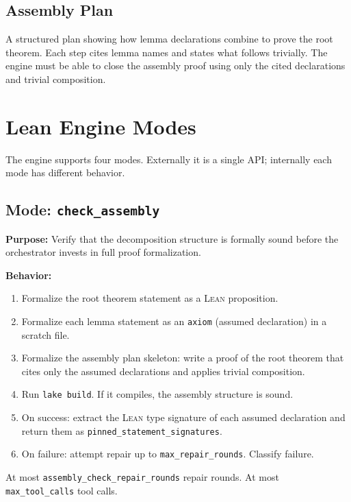 \documentclass[11pt,a4paper]{article}
\newcommand{\Lean}{\textsc{Lean}}
\begin{document}
\subsection{Assembly Plan}
A structured plan showing how lemma declarations combine to prove the root theorem. Each step cites lemma names and states what follows trivially. The engine must be able to close the assembly proof using only the cited declarations and trivial composition.

\section{Lean Engine Modes}
\label{sec:modes}

The engine supports four modes. Externally it is a single API; internally each mode has different behavior.

\subsection{Mode: \texttt{check\_assembly}}

\textbf{Purpose:} Verify that the decomposition structure is formally sound before the orchestrator invests in full proof formalization.

\textbf{Behavior:}
\begin{enumerate}[leftmargin=2em]
  \item Formalize the root theorem statement as a \Lean{} proposition.
  \item Formalize each lemma statement as an \texttt{axiom} (assumed declaration) in a scratch file.
  \item Formalize the assembly plan skeleton: write a proof of the root theorem that cites only the assumed declarations and applies trivial composition.
  \item Run \texttt{lake build}. If it compiles, the assembly structure is sound.
  \item On success: extract the \Lean{} type signature of each assumed declaration and return them as \texttt{pinned\_statement\_signatures}.
  \item On failure: attempt repair up to \texttt{max\_repair\_rounds}. Classify failure.
\end{enumerate}

At most \texttt{assembly\_check\_repair\_rounds} repair rounds. At most \texttt{max\_tool\_calls} tool calls.
\end{document}
